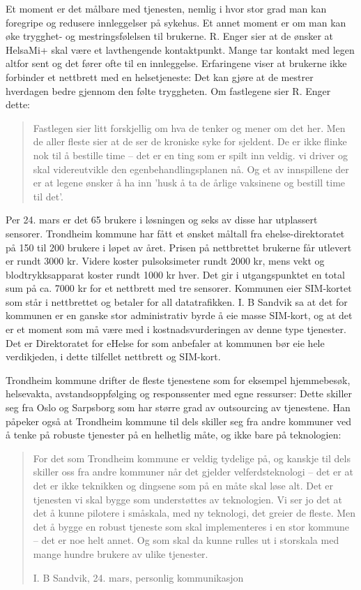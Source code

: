 Et moment er det målbare med tjenesten, nemlig i hvor stor grad man kan foregripe og redusere innleggelser på sykehus. Et annet moment er om man kan
øke trygghet- og mestringsfølelsen til brukerne. R. Enger sier at de ønsker at HelsaMi+ skal være et lavthengende kontaktpunkt. Mange tar kontakt
med legen altfor sent og det fører ofte til en innleggelse. Erfaringene viser at brukerne ikke forbinder et nettbrett med en
helsetjeneste:  Det kan gjøre at de mestrer
hverdagen bedre gjennom den følte tryggheten. Om fastlegene sier R. Enger dette: \blockquote{Fastlegen sier litt forskjellig om hva de tenker og mener
om det her. Men de aller fleste sier at de ser de kroniske syke for sjeldent. De er ikke flinke nok til å bestille time -- det
er en ting som er spilt inn veldig. vi driver og skal videreutvikle den
egenbehandlingsplanen nå. Og et av innspillene der er at legene ønsker å ha inn 'husk å ta de årlige vaksinene og bestill time til det'.}

Per 24. mars er det 65 brukere i løsningen og seks av disse har utplassert sensorer. Trondheim kommune har fått et ønsket måltall fra
ehelse-direktoratet på 150 til 200 brukere i løpet av året. Prisen på nettbrettet brukerne får utlevert er rundt 3000 kr. Videre koster
pulsoksimeter rundt 2000 kr, mens vekt og blodtrykksapparat koster rundt 1000 kr hver. Det gir i utgangspunktet en total sum på ca. 7000 kr
for et nettbrett med tre sensorer. Kommunen eier SIM-kortet som står i nettbrettet og betaler for all datatrafikken. I. B Sandvik sa at
det for kommunen er en ganske stor administrativ byrde å eie masse SIM-kort, og at det er et moment som må være med i kostnadsvurderingen
av denne type tjenester. Det er Direktoratet for eHelse for som anbefaler at kommunen bør eie hele verdikjeden, i dette tilfellet nettbrett
og SIM-kort.

Trondheim kommune drifter de fleste tjenestene som for eksempel hjemmebesøk, helsevakta, avstandsoppfølging og responssenter med egne ressurser:
Dette skiller seg fra Oslo og Sarpsborg som har større grad av outsourcing av tjenestene. Han påpeker også at Trondheim kommune til dels skiller
seg fra andre kommuner ved å tenke på robuste tjenester på en helhetlig måte, og ikke bare på teknologien:
\blockquote[I. B Sandvik, 24. mars, personlig kommunikasjon]{For det som Trondheim kommune er
    veldig tydelige på, og kanskje til dels skiller oss fra andre kommuner når det gjelder velferdsteknologi -- det er at det er ikke teknikken og dingsene som på en måte skal
    løse alt. Det er tjenesten vi skal bygge som understøttes av teknologien.
    Vi ser jo det at det å kunne pilotere i småskala, med ny teknologi, det greier de fleste. Men det å bygge en robust tjeneste som skal implementeres i en stor kommune
-- det er noe helt annet. Og som skal da kunne rulles ut i storskala med mange hundre brukere av ulike tjenester.}


